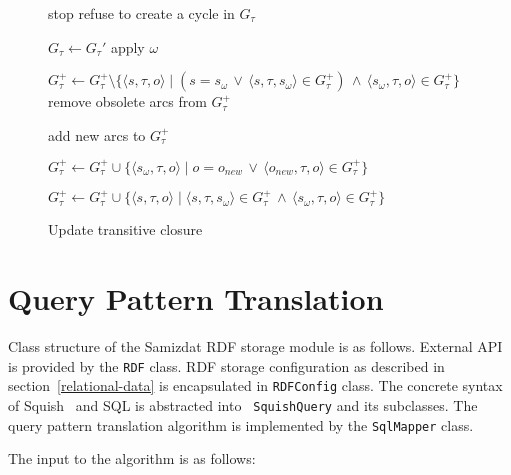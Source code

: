 \documentclass[conference,letterpaper]{IEEEtran}
\begin{document}
\begin{figure}
\begin{algorithmic}[1]

  \State stop
  \Comment refuse to create a cycle in $G_\tau$
\EndIf

\State $G_\tau \gets G_\tau'$
\Comment apply $\omega$

  \State $G_\tau^+ \gets G_\tau^+ \setminus
    \{ \langle s, \tau, o \rangle \mid
    (s = s_\omega \, \vee \,
      \langle s, \tau, s_\omega \rangle \in G_\tau^+) \, \wedge \,
    \langle s_\omega, \tau, o \rangle \in G_\tau^+ \}$
  \Comment remove obsolete arcs from $G_\tau^+$
\EndIf

  \Comment add new arcs to $G_\tau^+$

  \State $G_\tau^+ \gets G_\tau^+ \cup
    \{ \langle s_\omega, \tau, o \rangle \mid
      o = o_{new} \, \vee \,
      \langle o_{new}, \tau, o \rangle \in G_\tau^+ \}$

  \State $G_\tau^+ \gets G_\tau^+ \cup
    \{ \langle s, \tau, o \rangle \mid
      \langle s, \tau, s_\omega \rangle \in G_\tau^+ \, \wedge \,
      \langle s_\omega, \tau, o \rangle \in G_\tau^+ \}$
\EndIf

\end{algorithmic}
\caption{Update transitive closure}
\label{transitive-closure}
\end{figure}


\section{Query Pattern Translation}
\label{query-translation}

Class structure of the Samizdat RDF storage module is as follows.
External API is provided by the {\tt RDF} class. RDF storage
configuration as described in section~\ref{relational-data} is
encapsulated in {\tt RDFConfig} class. The concrete syntax of
Squish~\cite{samizdat-rel-rdf,squish} and SQL is abstracted into {\tt
SquishQuery} and its subclasses. The query pattern translation algorithm
is implemented by the {\tt SqlMapper} class. 


The input to the algorithm is as follows:
\end{document}
